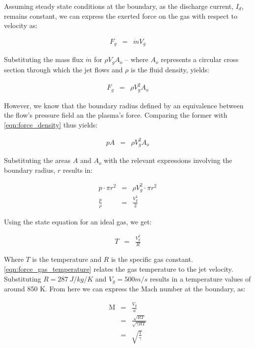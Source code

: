 \documentclass[a4paper]{iacas}%
\begin{document}
Assuming steady state conditions at the boundary, as the discharge current, $I_d$, remains constant, we can express the exerted force on the gas with respect to velocity as:

\begin{eqnarray}\label{eqn:force_mass_flux}
	F_g &=& \dot{m} V_g
\end{eqnarray}

Substituting the mass flux $\dot{m}$ for $\rho V_g A_{o}$ -- where $A_{o}$ represents a circular cross section through which the jet flows and $\rho$ is the fluid density, yields:

\begin{eqnarray}\label{eqn:force_density}
F_g &=& \rho V^2_g A_{o}
\end{eqnarray}

However, we know that the boundary radius defined by an equivalence between the flow's pressure field an the plasma's force. Comparing the former with 
\eqref{eqn:force_density} thus yields:

\begin{eqnarray}\label{eqn:force_gas_equal}
p A &=& \rho V^2_g A_{o}
\end{eqnarray}

Substituting the areas $A$ and $A_o$ with the relevant expressions involving the boundary radius, $r$ results in: 

\begin{eqnarray}\label{eqn:force_gas_ratio}
p \cdot \pi r^2 &=& \rho V^2_g \cdot \pi r^2 \\
\frac{p}{\rho} &=& \frac{V^2_g}{2}
\end{eqnarray}

Using the state equation for an ideal gas, we get:

\begin{eqnarray}\label{eqn:force_gas_temperature}
	T &=& \frac{V^2_g}{R}
\end{eqnarray}

Where $T$ is the temperature and $R$ is the specific gas constant. \eqref{eqn:force_gas_temperature} relates the gas temperature to the jet velocity. Substituting $R = 287~J/kg/K$ and $V_g = 500 m/s$ results in a temperature values of around 850 K. From here we can express the Mach number at the boundary, as:

\begin{eqnarray}
	\mathrm{M} &=& \frac{V_g}{a} \\
	 &=& \frac{\sqrt{RT}}{\sqrt{\gamma R T}}\\\label{eqn:mach}
	 &=& \sqrt{\frac{1}{\gamma}}
\end{eqnarray}
\end{document}
